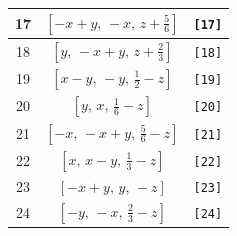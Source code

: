 \documentclass[fleqn,8pt]{jsarticle}
\begin{document}
\begin{longtable}{ccc}
17 & $\left[ - x + y,\, - x,\, z + \frac{5}{6} \right]$ & {\tt [17]} \\ \hline
18 & $\left[ y,\, - x + y,\, z + \frac{2}{3} \right]$ & {\tt [18]} \\ \hline
19 & $\left[ x - y,\, - y,\, \frac{1}{2} - z \right]$ & {\tt [19]} \\ \hline
20 & $\left[ y,\, x,\, \frac{1}{6} - z \right]$ & {\tt [20]} \\ \hline
21 & $\left[ - x,\, - x + y,\, \frac{5}{6} - z \right]$ & {\tt [21]} \\ \hline
22 & $\left[ x,\, x - y,\, \frac{1}{3} - z \right]$ & {\tt [22]} \\ \hline
23 & $\left[ - x + y,\, y,\, - z \right]$ & {\tt [23]} \\ \hline
24 & $\left[ - y,\, - x,\, \frac{2}{3} - z \right]$ & {\tt [24]} \\
\end{longtable}
\end{document}
